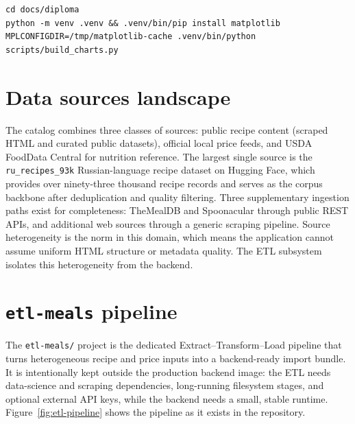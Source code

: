 \begin{lstlisting}[caption={Regenerate the evaluation charts.},label={lst:regen-charts}]
cd docs/diploma
python -m venv .venv && .venv/bin/pip install matplotlib
MPLCONFIGDIR=/tmp/matplotlib-cache .venv/bin/python scripts/build_charts.py
\end{lstlisting}

\section{Data sources landscape}

The catalog combines three classes of sources: public recipe content (scraped HTML and curated public datasets), official local price feeds, and USDA FoodData Central for nutrition reference. The largest single source is the \texttt{ru\_recipes\_93k} Russian-language recipe dataset on Hugging Face, which provides over ninety-three thousand recipe records and serves as the corpus backbone after deduplication and quality filtering. Three supplementary ingestion paths exist for completeness: TheMealDB and Spoonacular through public REST APIs, and additional web sources through a generic scraping pipeline. Source heterogeneity is the norm in this domain, which means the application cannot assume uniform HTML structure or metadata quality. The ETL subsystem isolates this heterogeneity from the backend.

\section{\texttt{etl-meals} pipeline}
\label{sec:etl-meals-pipeline}

The \texttt{etl-meals/} project is the dedicated Extract--Transform--Load pipeline that turns heterogeneous recipe and price inputs into a backend-ready import bundle. It is intentionally kept outside the production backend image: the ETL needs data-science and scraping dependencies, long-running filesystem stages, and optional external API keys, while the backend needs a small, stable runtime. Figure~\ref{fig:etl-pipeline} shows the pipeline as it exists in the repository.

